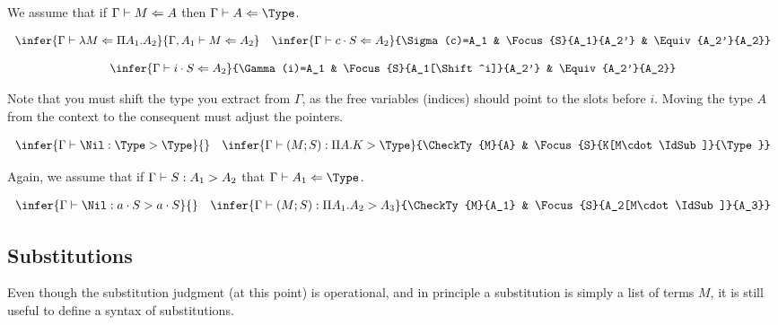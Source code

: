 \bigskip 
{}
\bigskip 

We assume that if $\Gamma\vdash M \Leftarrow A$ then $\CheckTy{A}{\Type}$.

$$
\begin{array}{cc}
\infer{\CheckTy{\Lam{M}}{\PiTyp{A_1}{A_2}}}{\CheckTy[\Gamma,A_1]{M}{A_2}} &
\infer{\CheckTy{c\cdot S}{A_2}}{\Sigma(c)=A_1 & \Focus{S}{A_1}{A_2'} & \Equiv{A_2'}{A_2}} \\\\
\multicolumn{2}{c}{\infer{\CheckTy{i\cdot S}{A_2}}{\Gamma(i)=A_1 & \Focus{S}{A_1[\Shift^i]}{A_2'} & \Equiv{A_2'}{A_2}}}
\end{array} 
$$

\bigskip 

Note that you must shift the type you extract from $\Gamma$, as the
free variables (indices) should point to the slots before $i$.  Moving
the type $A$ from the context to the consequent must adjust the pointers.

\bigskip 
{}
\bigskip 

$$
\begin{array}{lr}
\infer{\Focus{\Nil}{\Type}{\Type}}{} & 
\infer{\Focus{(M;S)}{\PiTyp{A}{K}}{\Type}}{\CheckTy{M}{A} & \Focus{S}{K[M\cdot\IdSub]}{\Type}}
\end{array} 
$$

\bigskip 
{}
\bigskip 

Again, we assume that if $\Gamma\vdash S : A_1 > A_2$ that $\CheckTy{A_1}{\Type}$.

$$
\begin{array}{lr}
\infer{\Focus{\Nil}{a\cdot S}{a\cdot S}}{} & 
\infer{\Focus{(M;S)}{\PiTyp{A_1}{A_2}}{A_3}}{\CheckTy{M}{A_1} & \Focus{S}{A_2[M\cdot\IdSub]}{A_3}}
\end{array} 
$$


\subsection{Substitutions}

Even though the substitution judgment (at this point) is operational,
and in principle a substitution is simply a list of terms $M$,
it is still useful to define a syntax of substitutions.  

